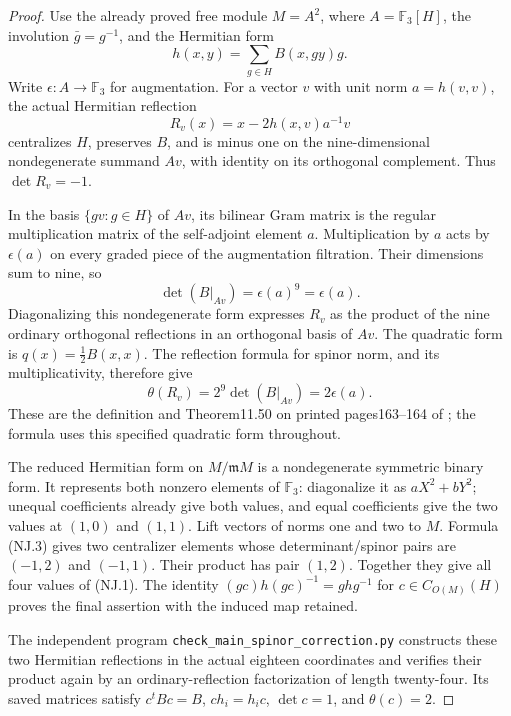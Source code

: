 \begin{proof}
Use the already proved free module \(M=A^2\), where
\(A=\mathbb F_3[H]\), the involution \(\bar g=g^{-1}\), and the
Hermitian form
\[
 h(x,y)=\sum_{g\in H}B(x,gy)g.
\]
Write \(\epsilon:A\to\mathbb F_3\) for augmentation. For a vector
\(v\) with unit norm \(a=h(v,v)\), the actual Hermitian reflection
\[
 R_v(x)=x-2h(x,v)a^{-1}v
 \tag{NJ.2}
\]
centralizes \(H\), preserves \(B\), and is minus one on the
nine-dimensional nondegenerate summand \(Av\), with identity on its
orthogonal complement. Thus \(\det R_v=-1\).

In the basis \(\{gv:g\in H\}\) of \(Av\), its bilinear Gram matrix
is the regular multiplication matrix of the self-adjoint element \(a\).
Multiplication by \(a\) acts by \(\epsilon(a)\) on every graded piece
of the augmentation filtration. Their dimensions sum to nine, so
\[
 \det(B|_{Av})=\epsilon(a)^9=\epsilon(a).
\]
Diagonalizing this nondegenerate form expresses \(R_v\) as the
product of the nine ordinary orthogonal reflections in an orthogonal
basis of \(Av\). The quadratic form is \(q(x)=\tfrac12 B(x,x)\).
The reflection formula for spinor norm, and its multiplicativity,
therefore give
\[
          \theta(R_v)=2^9\det(B|_{Av})=2\epsilon(a).
 \tag{NJ.3}
\]
These are the definition and Theorem11.50 on printed pages163--164
of \cite{GhostTaylorClassical}; the formula uses this specified
quadratic form throughout.

The reduced Hermitian form on \(M/\mathfrak mM\) is a nondegenerate
symmetric binary form. It represents both nonzero elements of
\(\mathbb F_3\): diagonalize it as \(aX^2+bY^2\); unequal
coefficients already give both values, and equal coefficients give
the two values at \((1,0)\) and \((1,1)\).
Lift vectors of norms one and two to \(M\). Formula (NJ.3) gives
two centralizer elements whose determinant/spinor pairs are
\((-1,2)\) and \((-1,1)\). Their product has pair \((1,2)\).
Together they give all four values of (NJ.1).
The identity
\((gc)h(gc)^{-1}=ghg^{-1}\) for \(c\in C_{O(M)}(H)\)
proves the final assertion with the induced map retained.

The independent program \texttt{check\_main\_spinor\_correction.py}
constructs these two Hermitian reflections in the actual eighteen
coordinates and verifies their product again by an ordinary-reflection
factorization of length twenty-four. Its saved matrices satisfy
\(c^tBc=B\), \(ch_i=h_ic\), \(\det c=1\), and \(\theta(c)=2\).
\end{proof}

